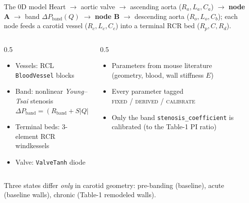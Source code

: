 \documentclass[aspectratio=169]{beamer}
\begin{document}
\begin{frame}{The 0D model}
\small
Heart $\to$ aortic valve $\to$ ascending aorta ($R_a,L_a,C_a$) $\to$
\textbf{node A} $\to$ band $\Delta P_\text{band}(Q)$ $\to$ \textbf{node B} $\to$
descending aorta ($R_o,L_o,C_b$); each node feeds a carotid vessel
($R_c,L_c,C_c$) into a terminal RCR bed ($R_p,C,R_d$).
\begin{columns}[T]
\begin{column}{0.5\textwidth}
\begin{itemize}
  \item Vessels: RCL \texttt{BloodVessel} blocks
  \item Band: nonlinear \emph{Young--Tsai} stenosis \\
        $\Delta P_\text{band}=(R_\text{band}+S|Q|)Q + L_\text{band}\,\dot Q$
  \item Terminal beds: 3-element RCR windkessels
  \item Valve: \texttt{ValveTanh} diode
\end{itemize}
\end{column}
\begin{column}{0.5\textwidth}
\begin{itemize}
  \item Parameters from mouse literature \\ (geometry, blood, wall stiffness $E$)
  \item Every parameter tagged \\ \textsc{fixed} / \textsc{derived} / \textsc{calibrate}
  \item Only the band \texttt{stenosis\_coefficient} is calibrated
        (to the Table-1 PI ratio)
\end{itemize}
\end{column}
\end{columns}
\vspace{0.5em}
\centering\footnotesize Three states differ \emph{only} in carotid geometry:
pre-banding (baseline), acute (baseline walls), chronic (Table-1 remodeled walls).
\end{frame}
\end{document}
